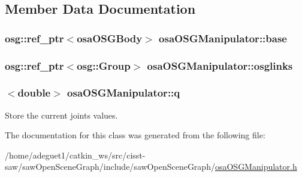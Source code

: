 \subsection{Member Data Documentation}
\hypertarget{classosa_o_s_g_manipulator_a6c69fd718f80ec8c73a408f01d2819ef}{
\subsubsection[{base}]{\setlength{\rightskip}{0pt plus 5cm}osg\-::ref\-\_\-ptr$<${\bf osa\-O\-S\-G\-Body}$>$ osa\-O\-S\-G\-Manipulator\-::base\hspace{0.3cm}{\ttfamily [protected]}}}\label{classosa_o_s_g_manipulator_a6c69fd718f80ec8c73a408f01d2819ef}
\hypertarget{classosa_o_s_g_manipulator_ad1e42f7391b136a347497f9e6f9df761}{
\subsubsection[{osglinks}]{\setlength{\rightskip}{0pt plus 5cm}osg\-::ref\-\_\-ptr$<$osg\-::\-Group$>$ osa\-O\-S\-G\-Manipulator\-::osglinks\hspace{0.3cm}{\ttfamily [protected]}}}\label{classosa_o_s_g_manipulator_ad1e42f7391b136a347497f9e6f9df761}
\hypertarget{classosa_o_s_g_manipulator_a834ce7263dace4d925133753522abaa3}{
\subsubsection[{q}]{$<$double$>$ osa\-O\-S\-G\-Manipulator\-::q\hspace{0.3cm}{\ttfamily [protected]}}}\label{classosa_o_s_g_manipulator_a834ce7263dace4d925133753522abaa3}


Store the current joints values. 



The documentation for this class was generated from the following file\-:\begin{DoxyCompactItemize}
\item 
/home/adeguet1/catkin\-\_\-ws/src/cisst-\/saw/saw\-Open\-Scene\-Graph/include/saw\-Open\-Scene\-Graph/\hyperlink{osa_o_s_g_manipulator_8h}{osa\-O\-S\-G\-Manipulator.\-h}\end{DoxyCompactItemize}
